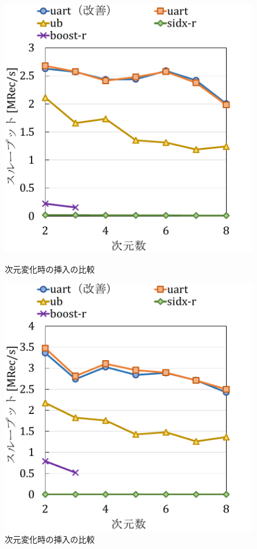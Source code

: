 \begin{figure}
  \begin{minipage}[c]{0.495\textwidth}
    \centering
    \includegraphics[scale=0.5]{./figures/graph-dimention-insert-0.pdf}
    \caption{次元変化時の挿入の比較}
    \label{graph:}
  \end{minipage}
  \begin{minipage}[c]{0.495\textwidth}
    \centering
    \includegraphics[scale=0.5]{./figures/graph-dimention-insert-0.5.pdf}
    \caption{次元変化時の挿入の比較}
    \label{graph:paired}
  \end{minipage}
\end{figure}

